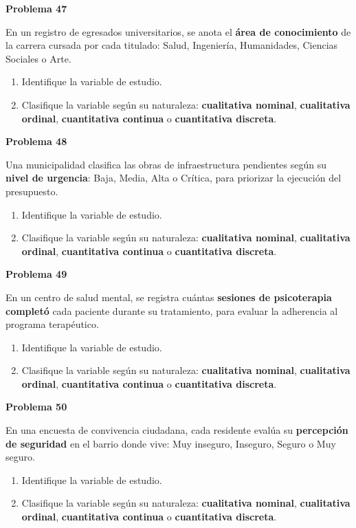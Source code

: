 \documentclass[10pt,letterpaper]{article}
\newcommand{\problema}[1]{%
  \vspace{2pt}%
  \begin{tcolorbox}[
    enhanced,
    colback=white,
    colframe=black,
    arc=0pt,
    boxrule=0pt,
    leftrule=2pt,
    left=6pt, right=6pt,
    top=1pt, bottom=1pt,
  ]
    {\normalsize\bfseries\sffamily #1}
  \end{tcolorbox}%
  \vspace{1pt}%
}
\begin{document}
\problema{Problema 47}
\noindent\sffamily\small En un registro de egresados universitarios, se anota el \textbf{\'area de conocimiento} de la carrera cursada por cada titulado: Salud, Ingenier\'ia, Humanidades, Ciencias Sociales o Arte.
\begin{enumerate}[leftmargin=1.2cm, label=\textbf{\alph*)}, itemsep=0pt, topsep=2pt]
  \item Identifique la variable de estudio.
  \item Clasifique la variable seg\'un su naturaleza: \textbf{cualitativa nominal}, \textbf{cualitativa ordinal}, \textbf{cuantitativa continua} o \textbf{cuantitativa discreta}.
\end{enumerate}

\problema{Problema 48}
\noindent\sffamily\small Una municipalidad clasifica las obras de infraestructura pendientes seg\'un su \textbf{nivel de urgencia}: Baja, Media, Alta o Cr\'itica, para priorizar la ejecuci\'on del presupuesto.
\begin{enumerate}[leftmargin=1.2cm, label=\textbf{\alph*)}, itemsep=0pt, topsep=2pt]
  \item Identifique la variable de estudio.
  \item Clasifique la variable seg\'un su naturaleza: \textbf{cualitativa nominal}, \textbf{cualitativa ordinal}, \textbf{cuantitativa continua} o \textbf{cuantitativa discreta}.
\end{enumerate}

\problema{Problema 49}
\noindent\sffamily\small En un centro de salud mental, se registra cu\'antas \textbf{sesiones de psicoterapia complet\'o} cada paciente durante su tratamiento, para evaluar la adherencia al programa terap\'eutico.
\begin{enumerate}[leftmargin=1.2cm, label=\textbf{\alph*)}, itemsep=0pt, topsep=2pt]
  \item Identifique la variable de estudio.
  \item Clasifique la variable seg\'un su naturaleza: \textbf{cualitativa nominal}, \textbf{cualitativa ordinal}, \textbf{cuantitativa continua} o \textbf{cuantitativa discreta}.
\end{enumerate}

\problema{Problema 50}
\noindent\sffamily\small En una encuesta de convivencia ciudadana, cada residente eval\'ua su \textbf{percepci\'on de seguridad} en el barrio donde vive: Muy inseguro, Inseguro, Seguro o Muy seguro.
\begin{enumerate}[leftmargin=1.2cm, label=\textbf{\alph*)}, itemsep=0pt, topsep=2pt]
  \item Identifique la variable de estudio.
  \item Clasifique la variable seg\'un su naturaleza: \textbf{cualitativa nominal}, \textbf{cualitativa ordinal}, \textbf{cuantitativa continua} o \textbf{cuantitativa discreta}.
\end{enumerate}
\end{document}
